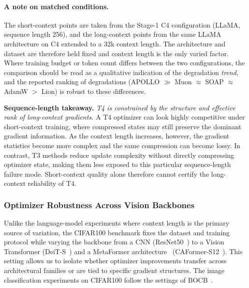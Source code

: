 \paragraph{A note on matched conditions.}
The short-context points are taken from the Stage-1 C4 configuration
(LLaMA, sequence length 256), and the long-context points from the same
LLaMA architecture on C4 extended to a 32k context length. The architecture
and dataset are therefore held fixed and context length is the only varied
factor. Where training budget
or token count differs between the two configurations, the comparison should
be read as a qualitative indication of the degradation \emph{trend}, and the
reported ranking of degradations (APOLLO $\gg$ Muon
$\approx$ SOAP $\approx$ AdamW $>$ Lion) is robust to these differences.

\begin{takeaway}
\noindent\textbf{Sequence-length takeaway.}
\emph{T4 is constrained by the structure and effective rank of long-context
gradients.} A T4 optimizer can look highly competitive under short-context
training, where compressed states may still preserve the dominant gradient
information. As the context length increases, however, the gradient statistics
become more complex and the same compression can become lossy. In contrast,
T3 methods reduce update complexity without directly compressing optimizer
state, making them less exposed to this particular sequence-length failure
mode. Short-context quality alone therefore cannot certify the long-context
reliability of T4.
\end{takeaway}


\subsubsection{Optimizer Robustness Across Vision Backbones}
Unlike the language-model experiments where context length is the primary
source of variation, the CIFAR100 benchmark fixes the dataset and training
protocol while varying the backbone from a CNN (ResNet50~\cite{he2016deep}) to a Vision
Transformer (DeiT-S~\cite{touvron2021training}) and a MetaFormer
architecture~\cite{yu2022metaformer} (CAFormer-S12~\cite{yu2023metaformer}). This
setting allows us to isolate whether optimizer improvements transfer across
architectural families or are tied to specific gradient structures. The image classification experiments on CIFAR100 follow the settings of BOCB~\cite{li2024unveiling}.

